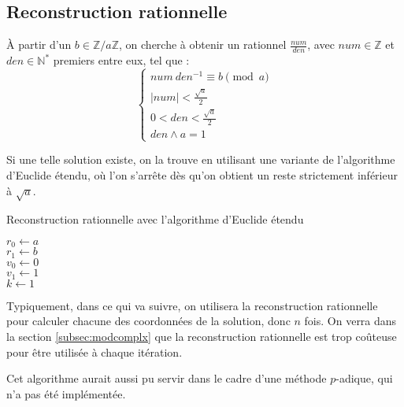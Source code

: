 \documentclass[french]{article}
\begin{document}
\subsection{Reconstruction rationnelle} \label{subsec:recrat}
À partir d'un $b \in \mathbb{Z}/a\mathbb{Z}$, on cherche à obtenir un rationnel $\frac{num}{den}$, avec $num \in \mathbb{Z}$ et $den \in \mathbb{N}^*$ premiers entre eux, tel que :
\begin{equation*}
	\begin{cases}
		num \  den^{-1} \equiv b \pmod a\\
		\lvert num \rvert < \frac{\sqrt{a}}{2}\\
		0 < den < \frac{\sqrt{a}}{2}\\
		den \wedge a = 1
	\end{cases}
\end{equation*}
\par
Si une telle solution existe, on la trouve en utilisant une variante de l'algorithme d'Euclide étendu, où l'on s'arrête dès qu'on obtient un reste strictement inférieur à $\sqrt{a}$.
\newline\newline
\begin{algorithm}[H]
	\DontPrintSemicolon
	\caption{Reconstruction rationnelle avec l'algorithme d'Euclide étendu}
	$r_0 \gets a$\\
	$r_1 \gets b$\\
	$v_0 \gets 0$\\
	$v_1 \gets 1$\\
	$k \gets 1$\\
\end{algorithm}
\leavevmode
\par
Typiquement, dans ce qui va suivre, on utilisera la reconstruction rationnelle pour calculer chacune des coordonnées de la solution, donc $n$ fois.
On verra dans la section \ref{subsec:modcomplx} que la reconstruction rationnelle est trop coûteuse pour être utilisée à chaque itération.
\par Cet algorithme aurait aussi pu servir dans le cadre d'une méthode $p$-adique, qui n'a pas été implémentée.
\end{document}
